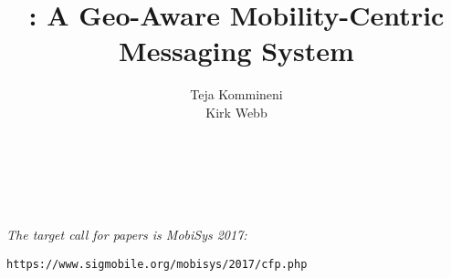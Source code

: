 \documentclass[letterpaper,twocolumn,10pt]{sig-alternate-10pt}
\title{\name{}: A Geo-Aware Mobility-Centric Messaging System}
\author{
  \alignauthor Teja Kommineni\\
  \affaddr{teja.kommineni@utah.edu}
  \alignauthor Kirk Webb\\
  \affaddr{kwebb@cs.utah.edu}
  \sharedaffiliation
  \affaddr{School of Computing}\\
  \affaddr{University of Utah}\\
  \affaddr{50 S. Central Campus Drive}\\
  \affaddr{Salt Lake City, UT - 84112}
}
\begin{document}
\maketitle

{\it The target call for papers is MobiSys 2017: 
\begin{verbatim}https://www.sigmobile.org/mobisys/2017/cfp.php\end{verbatim}}










%


{
  \small 
  
  
}
\end{document}
